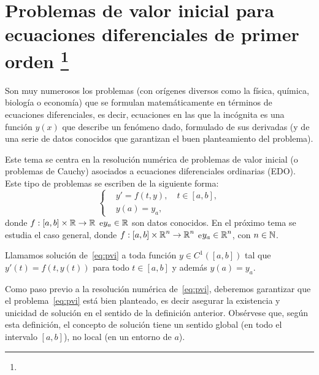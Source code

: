\renewcommand{\tt}{t}
\newcommand{\yy}{y}
\newcommand{\ta}{a}
\newcommand{\tb}{b}
\newcommand{\ycero}{y_a}
\newcommand{\ee}{e\xspace}
\newcommand{\sol}{y}

\chapter[Problemas de valor inicial para EDOs de primer orden]
{Problemas de valor inicial para ecuaciones diferenciales de primer
  orden%
  \footnote{\licenseInfo}}

Son muy numerosos los problemas (con orígenes diversos como la física,
química, biología o economía) que se formulan matemáticamente en
términos de ecuaciones diferenciales, es decir, ecuaciones en las que
la incógnita es una función $y(x)$ que describe un fenómeno dado, formulado 
de sus derivadas (y de una serie de datos conocidos que garantizan el buen
planteamiento del problema). 

Este tema se centra en la resolución numérica de problemas de valor
inicial (o problemas de Cauchy) asociados a ecuaciones diferenciales
ordinarias (EDO). Este tipo de problemas se escriben de la siguiente
forma:
\begin{equation}
  \label{eq:pvi}
  \tag{PVI}
  \left\{
  \begin{aligned}
    &y' = f(\tt,\yy), \quad \tt\in[\ta,\tb],
    \\
    &y(\ta) = \ycero,
  \end{aligned}
  \right.
\end{equation}
donde $f:[\ta,\tb]\times\Rset\to\Rset$ \ee $\ycero\in\Rset$ son datos
conocidos. En el próximo tema se estudia el caso general, donde
$f:[\ta,\tb]\times\Rset^n\to\Rset^n$ \ee $\ycero\in\Rset^n$, con
$n\in\operatorname{{\mathbb N}}$.

\begin{definition}
  Llamamos solución de~\eqref{eq:pvi} a toda función $\sol\in
  C^1([\ta,\tb])$ tal que $\sol'(\tt)=f(\tt,\sol(\tt))$ para todo
  $\tt\in[\ta,\tb]$ y además $\sol(\ta)=\ycero$.\label{def:3}
\end{definition}


Como paso previo a la resolución numérica de~\eqref{eq:pvi}, deberemos
garantizar que el problema~\eqref{eq:pvi} está bien planteado, es
decir asegurar la existencia y unicidad de solución en el sentido de
la definición anterior. Obsérvese que, según esta definición, el
concepto de solución tiene un sentido global (en todo el intervalo
$[a,b]$), no local (en un entorno de $\ta$).

